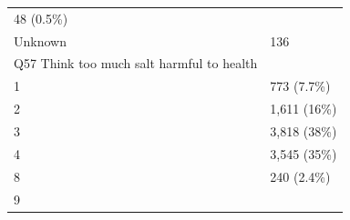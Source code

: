 \documentclass[]{article}
\begin{document}
\begin{longtable}[]{@{}ll@{}}
\begin{minipage}[t]{0.23\columnwidth}
48 (0.5\%)\strut
\end{minipage}\tabularnewline
\begin{minipage}[t]{0.71\columnwidth}\raggedright
Unknown\strut
\end{minipage} & \begin{minipage}[t]{0.23\columnwidth}\raggedright
136\strut
\end{minipage}\tabularnewline
\begin{minipage}[t]{0.71\columnwidth}\raggedright
Q57 Think too much salt harmful to health\strut
\end{minipage} & \begin{minipage}[t]{0.23\columnwidth}\raggedright
\strut
\end{minipage}\tabularnewline
\begin{minipage}[t]{0.71\columnwidth}\raggedright
1\strut
\end{minipage} & \begin{minipage}[t]{0.23\columnwidth}\raggedright
773 (7.7\%)\strut
\end{minipage}\tabularnewline
\begin{minipage}[t]{0.71\columnwidth}\raggedright
2\strut
\end{minipage} & \begin{minipage}[t]{0.23\columnwidth}\raggedright
1,611 (16\%)\strut
\end{minipage}\tabularnewline
\begin{minipage}[t]{0.71\columnwidth}\raggedright
3\strut
\end{minipage} & \begin{minipage}[t]{0.23\columnwidth}\raggedright
3,818 (38\%)\strut
\end{minipage}\tabularnewline
\begin{minipage}[t]{0.71\columnwidth}\raggedright
4\strut
\end{minipage} & \begin{minipage}[t]{0.23\columnwidth}\raggedright
3,545 (35\%)\strut
\end{minipage}\tabularnewline
\begin{minipage}[t]{0.71\columnwidth}\raggedright
8\strut
\end{minipage} & \begin{minipage}[t]{0.23\columnwidth}\raggedright
240 (2.4\%)\strut
\end{minipage}\tabularnewline
\begin{minipage}[t]{0.71\columnwidth}\raggedright
9\strut
\end{minipage} & \begin{minipage}[t]{0.23\columnwidth}\raggedright

\end{minipage}
\end{longtable}
\end{document}
